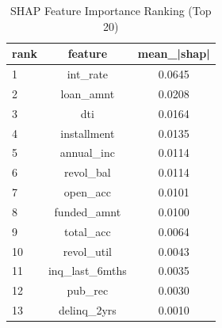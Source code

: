 \begin{table}
\centering
\caption{SHAP Feature Importance Ranking (Top 20)}
\label{tab:shap_ranking}
\begin{tabular}{lcc}
\toprule
rank & feature & mean_|shap| \\
\midrule
1 & int_rate & 0.0645 \\
2 & loan_amnt & 0.0208 \\
3 & dti & 0.0164 \\
4 & installment & 0.0135 \\
5 & annual_inc & 0.0114 \\
6 & revol_bal & 0.0114 \\
7 & open_acc & 0.0101 \\
8 & funded_amnt & 0.0100 \\
9 & total_acc & 0.0064 \\
10 & revol_util & 0.0043 \\
11 & inq_last_6mths & 0.0035 \\
12 & pub_rec & 0.0030 \\
13 & delinq_2yrs & 0.0010 \\
\bottomrule
\end{tabular}
\end{table}
